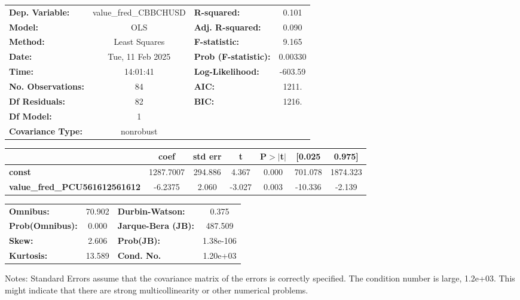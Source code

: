 \begin{center}
\begin{tabular}{lclc}
\toprule
\textbf{Dep. Variable:}               & value\_fred\_CBBCHUSD & \textbf{  R-squared:         } &     0.101   \\
\textbf{Model:}                       &          OLS          & \textbf{  Adj. R-squared:    } &     0.090   \\
\textbf{Method:}                      &     Least Squares     & \textbf{  F-statistic:       } &     9.165   \\
\textbf{Date:}                        &    Tue, 11 Feb 2025   & \textbf{  Prob (F-statistic):} &  0.00330    \\
\textbf{Time:}                        &        14:01:41       & \textbf{  Log-Likelihood:    } &   -603.59   \\
\textbf{No. Observations:}            &             84        & \textbf{  AIC:               } &     1211.   \\
\textbf{Df Residuals:}                &             82        & \textbf{  BIC:               } &     1216.   \\
\textbf{Df Model:}                    &              1        & \textbf{                     } &             \\
\textbf{Covariance Type:}             &       nonrobust       & \textbf{                     } &             \\
\bottomrule
\end{tabular}
\begin{tabular}{lcccccc}
                                      & \textbf{coef} & \textbf{std err} & \textbf{t} & \textbf{P$> |$t$|$} & \textbf{[0.025} & \textbf{0.975]}  \\
\midrule
\textbf{const}                        &    1287.7007  &      294.886     &     4.367  &         0.000        &      701.078    &     1874.323     \\
\textbf{value\_fred\_PCU561612561612} &      -6.2375  &        2.060     &    -3.027  &         0.003        &      -10.336    &       -2.139     \\
\bottomrule
\end{tabular}
\begin{tabular}{lclc}
\textbf{Omnibus:}       & 70.902 & \textbf{  Durbin-Watson:     } &     0.375  \\
\textbf{Prob(Omnibus):} &  0.000 & \textbf{  Jarque-Bera (JB):  } &   487.509  \\
\textbf{Skew:}          &  2.606 & \textbf{  Prob(JB):          } & 1.38e-106  \\
\textbf{Kurtosis:}      & 13.589 & \textbf{  Cond. No.          } &  1.20e+03  \\
\bottomrule
\end{tabular}
\end{center}

Notes: \newline
 [1] Standard Errors assume that the covariance matrix of the errors is correctly specified. \newline
 [2] The condition number is large, 1.2e+03. This might indicate that there are \newline
 strong multicollinearity or other numerical problems.